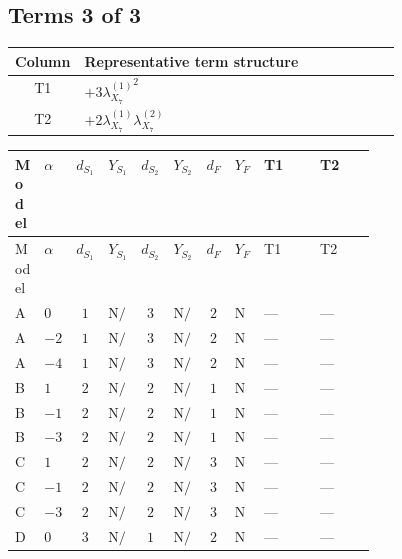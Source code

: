 \documentclass[8pt]{article}
\begin{document}
\begin{landscape}
\subsection*{Terms 3 of 3}
\begin{center}
\begin{tabular}{@{}c >{\raggedright\arraybackslash}p{0.82\linewidth}@{}}
\toprule
Column & Representative term structure \\
\midrule
T1 & \(\displaystyle +3 {\lambda_{X_{7}}^{(1)}}^2\) \\
\midrule
T2 & \(\displaystyle +2 {\lambda_{X_{7}}^{(1)}} {\lambda_{X_{7}}^{(2)}}\) \\
\midrule
\bottomrule
\end{tabular}
\end{center}
\smallskip
\tiny
\begin{longtable}{@{}llcccccc >{\raggedright\arraybackslash}p{0.21\linewidth} >{\raggedright\arraybackslash}p{0.21\linewidth}@{}}
\toprule
Model & $\alpha$ & $d_{S_1}$ & $Y_{S_1}$ & $d_{S_2}$ & $Y_{S_2}$ & $d_F$ & $Y_F$ & T1 & T2 \\
\midrule
\endfirsthead
\toprule
Model & $\alpha$ & $d_{S_1}$ & $Y_{S_1}$ & $d_{S_2}$ & $Y_{S_2}$ & $d_F$ & $Y_F$ & T1 & T2 \\
\midrule
\endhead
A & $0$ & $1$ & $\text{N/A}$ & $3$ & $\text{N/A}$ & $2$ & $\text{N/A}$ & --- & --- \\
\midrule
A & $-2$ & $1$ & $\text{N/A}$ & $3$ & $\text{N/A}$ & $2$ & $\text{N/A}$ & --- & --- \\
\midrule
A & $-4$ & $1$ & $\text{N/A}$ & $3$ & $\text{N/A}$ & $2$ & $\text{N/A}$ & --- & --- \\
\midrule
B & $1$ & $2$ & $\text{N/A}$ & $2$ & $\text{N/A}$ & $1$ & $\text{N/A}$ & --- & --- \\
\midrule
B & $-1$ & $2$ & $\text{N/A}$ & $2$ & $\text{N/A}$ & $1$ & $\text{N/A}$ & --- & --- \\
\midrule
B & $-3$ & $2$ & $\text{N/A}$ & $2$ & $\text{N/A}$ & $1$ & $\text{N/A}$ & --- & --- \\
\midrule
C & $1$ & $2$ & $\text{N/A}$ & $2$ & $\text{N/A}$ & $3$ & $\text{N/A}$ & --- & --- \\
\midrule
C & $-1$ & $2$ & $\text{N/A}$ & $2$ & $\text{N/A}$ & $3$ & $\text{N/A}$ & --- & --- \\
\midrule
C & $-3$ & $2$ & $\text{N/A}$ & $2$ & $\text{N/A}$ & $3$ & $\text{N/A}$ & --- & --- \\
\midrule
D & $0$ & $3$ & $\text{N/A}$ & $1$ & $\text{N/A}$ & $2$ & $\text{N/A}$ & --- & --- \\

\end{longtable}
\end{landscape}
\end{document}

